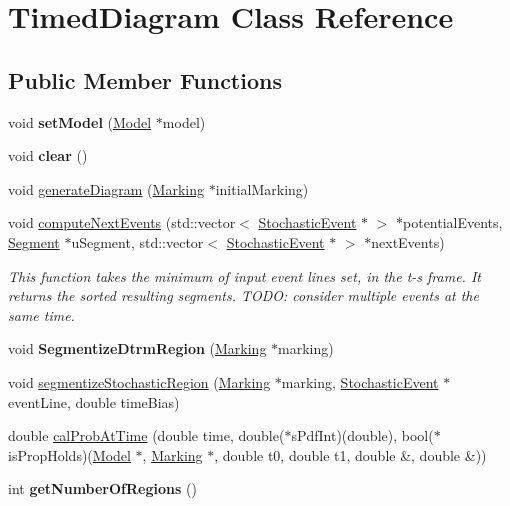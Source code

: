 \hypertarget{classTimedDiagram}{\section{Timed\-Diagram Class Reference}
\label{classTimedDiagram}
}
\subsection*{Public Member Functions}
\begin{DoxyCompactItemize}
\item 
\hypertarget{classTimedDiagram_adf699c8fddf11d5357faf2ef29bddd7c}{void {\bfseries set\-Model} (\hyperlink{structModel}{Model} $\ast$model)}\label{classTimedDiagram_adf699c8fddf11d5357faf2ef29bddd7c}

\item 
\hypertarget{classTimedDiagram_a7055f706b0c2444185e8d5d878626523}{void {\bfseries clear} ()}\label{classTimedDiagram_a7055f706b0c2444185e8d5d878626523}

\item 
void \hyperlink{classTimedDiagram_a55bc9188cb14b08bc95dde3778579f90}{generate\-Diagram} (\hyperlink{structMarking}{Marking} $\ast$initial\-Marking)
\item 
void \hyperlink{classTimedDiagram_aed76b48c2a65ee7ea16a393de058e581}{compute\-Next\-Events} (std\-::vector$<$ \hyperlink{structStochasticEvent}{Stochastic\-Event} $\ast$ $>$ $\ast$potential\-Events, \hyperlink{classSegment}{Segment} $\ast$u\-Segment, std\-::vector$<$ \hyperlink{structStochasticEvent}{Stochastic\-Event} $\ast$ $>$ $\ast$next\-Events)
\begin{DoxyCompactList}\small\item\em This function takes the minimum of input event lines set, in the t-\/s frame. It returns the sorted resulting segments. T\-O\-D\-O\-: consider multiple events at the same time. \end{DoxyCompactList}\item 
\hypertarget{classTimedDiagram_a51004d1d8a2ae7d80a089a54ecf93fec}{void {\bfseries Segmentize\-Dtrm\-Region} (\hyperlink{structMarking}{Marking} $\ast$marking)}\label{classTimedDiagram_a51004d1d8a2ae7d80a089a54ecf93fec}

\item 
void \hyperlink{classTimedDiagram_aa8d8af4ac9f2e51d12b6ae23b8c506c1}{segmentize\-Stochastic\-Region} (\hyperlink{structMarking}{Marking} $\ast$marking, \hyperlink{structStochasticEvent}{Stochastic\-Event} $\ast$event\-Line, double time\-Bias)
\item 
double \hyperlink{classTimedDiagram_a45ef38a01bcffd182224747bd2a96041}{cal\-Prob\-At\-Time} (double time, double($\ast$s\-Pdf\-Int)(double), bool($\ast$is\-Prop\-Holds)(\hyperlink{structModel}{Model} $\ast$, \hyperlink{structMarking}{Marking} $\ast$, double t0, double t1, double \&, double \&))
\item 
\hypertarget{classTimedDiagram_aa0eafacca33acf296c5bd1219f12fed8}{int {\bfseries get\-Number\-Of\-Regions} ()}\label{classTimedDiagram_aa0eafacca33acf296c5bd1219f12fed8}


\end{DoxyCompactItemize}
